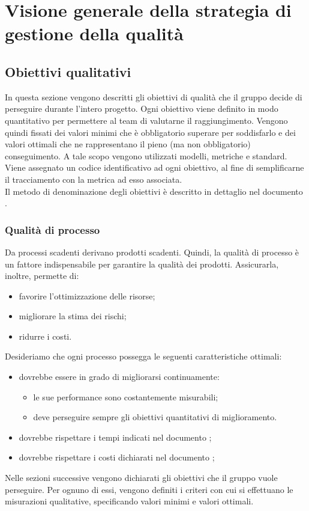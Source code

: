 \documentclass[PianoDiQualifica.tex]{subfiles}
\begin{document}
\section{Visione generale della strategia di gestione della qualità}
	\subsection{Obiettivi qualitativi}
		In questa sezione vengono descritti gli obiettivi di qualità che il gruppo \GRUPPO{} decide di perseguire durante l'intero progetto.
		Ogni obiettivo viene definito in modo quantitativo per permettere al team di valutarne il raggiungimento.
		Vengono quindi fissati dei valori minimi che è obbligatorio superare per soddisfarlo e dei valori ottimali che ne rappresentano il pieno (ma non obbligatorio) conseguimento.
		A tale scopo vengono utilizzati modelli, metriche e standard. \\
		Viene assegnato un codice identificativo ad ogni obiettivo, al fine di semplificarne il tracciamento con la metrica ad esso associata. \\
		Il metodo di denominazione degli obiettivi è descritto in dettaglio nel documento \NPdocRR.
		
		\subsubsection{Qualità di processo}
		Da processi scadenti derivano prodotti scadenti. Quindi, la qualità di processo è un fattore indispensabile per garantire la qualità dei prodotti. Assicurarla, inoltre, permette di:
		\begin{itemize}
			\item favorire l'ottimizzazione delle risorse; 
			\item migliorare la stima dei rischi;
			\item ridurre i costi.
		\end{itemize}
		Desideriamo che ogni processo possegga le seguenti caratteristiche ottimali:
		\begin{itemize}
			\item dovrebbe essere in grado di migliorarsi continuamente:
			\begin{itemize}
					\item le sue performance sono costantemente misurabili;
					\item deve perseguire sempre gli obiettivi quantitativi di miglioramento.
			\end{itemize}
			\item dovrebbe rispettare i tempi indicati nel documento \PPdocRR;
			\item dovrebbe rispettare i costi dichiarati nel documento \PPdocRR;
		\end{itemize}
		Nelle sezioni successive vengono dichiarati gli obiettivi che il gruppo vuole perseguire. Per ognuno di essi, vengono definiti i criteri con cui si effettuano le misurazioni qualitative,
		specificando valori minimi e valori ottimali.
\end{document}
